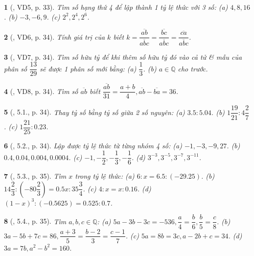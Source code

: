 \documentclass{article}
\newtheorem{baitoan}{}
\begin{document}
\begin{baitoan}[\cite{Binh_boi_duong_Toan_7_tap_1}, VD5, p. 33]
	Tìm số hạng thứ 4 để lập thành 1 tỷ lệ thức với 3 số: (a) $4,8,16$. (b) $-3,-6,9$. (c) $2^2,2^4,2^6$.
\end{baitoan}

\begin{baitoan}[\cite{Binh_boi_duong_Toan_7_tap_1}, VD6, p. 34]
	Tính giá trị của $k$ biết $k = \dfrac{\overline{ab}}{\overline{abc}} = \dfrac{\overline{bc}}{\overline{abc}} = \dfrac{\overline{ca}}{\overline{abc}}$.
\end{baitoan}

\begin{baitoan}[\cite{Binh_boi_duong_Toan_7_tap_1}, VD7, p. 34]
	Tìm số hữu tỷ để khi thêm số hữu tỷ đó vào cả tử \& mẫu của phân số $\dfrac{13}{29}$ sẽ được 1 phân số mới bằng: (a) $\dfrac{1}{3}$. (b) $a\in\mathbb{Q}$ cho trước.
\end{baitoan}

\begin{baitoan}[\cite{Binh_boi_duong_Toan_7_tap_1}, VD8, p. 34]
	Tìm số $\overline{ab}$ biết $\dfrac{\overline{ab}}{31} = \dfrac{a + b}{4},\overline{ab} - \overline{ba} = 36$.
\end{baitoan}

\begin{baitoan}[\cite{Binh_boi_duong_Toan_7_tap_1}, 5.1., p. 34]
	Thay tỷ số bằng tỷ số giữa 2 số nguyên: (a) $3.5:5.04$. (b) $1\dfrac{19}{21}:4\dfrac{2}{7}$. (c) $1\dfrac{21}{25}:0.23$.
\end{baitoan}

\begin{baitoan}[\cite{Binh_boi_duong_Toan_7_tap_1}, 5.2., p. 34]
	Lập được tỷ lệ thức từ từng nhóm 4 số: (a) $-1,-3,-9,27$. (b) $0.4,0.04,0.004,0.0004$. (c) $-1,-\dfrac{1}{2},-\dfrac{1}{3},-\dfrac{1}{6}$. (d) $3^{-3},3^{-5},3^{-7},3^{-11}$.
\end{baitoan}

\begin{baitoan}[\cite{Binh_boi_duong_Toan_7_tap_1}, 5.3., p. 35]
	Tìm $x$ trong tỷ lệ thức: (a) $6:x = 6.5:(-29.25)$. (b) $14\dfrac{2}{3}:\left(-80\dfrac{2}{3}\right) = 0.5x:35\dfrac{3}{4}$. (c) $4:x = x:0.16$. (d) $(1 - x)^3:(-0.5625) = 0.525:0.7$.
\end{baitoan}

\begin{baitoan}[\cite{Binh_boi_duong_Toan_7_tap_1}, 5.4., p. 35]
	Tìm $a,b,c\in\mathbb{Q}$: (a) $5a - 3b - 3c = -536,\dfrac{a}{4} = \dfrac{b}{6},\dfrac{b}{5} = \dfrac{c}{8}$. (b) $3a - 5b + 7c = 86,\dfrac{a + 3}{5} = \dfrac{b - 2}{3} = \dfrac{c - 1}{7}$. (c) $5a = 8b = 3c,a - 2b + c = 34$. (d) $3a = 7b,a^2 - b^2 = 160$.
\end{baitoan}
\end{document}
